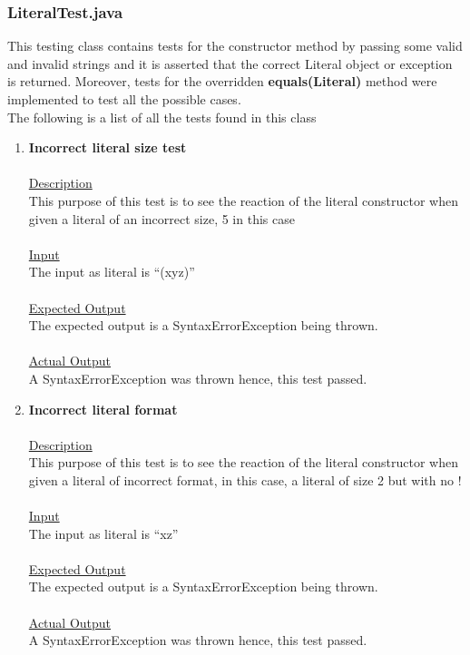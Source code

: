 \documentclass{article}
\newcommand{\quotes}[1]{``#1''}
\begin{document}
	\subsubsection{LiteralTest.java}
	
	This testing class contains tests for the constructor method by passing some valid and invalid strings and it is asserted that the correct Literal object or exception is returned. Moreover, tests for the overridden \textbf{equals(Literal)} method were implemented to test all the possible cases.\\
	The following is a list of all the tests found in this class
	

	\begin{enumerate}
		\item \textbf{Incorrect literal size test}\\\\
		\underline{Description}\\
		\indent This purpose of this test is to see the reaction of the literal constructor when given a literal of an incorrect size, 5 in this case\\\\
		\underline{Input}\\
		\indent The input as literal is \quotes{(xyz)}\\	\\
		\underline{Expected Output}\\
		\indent The expected output is a SyntaxErrorException being thrown.\\\\
		\underline{Actual Output}\\
		\indent A SyntaxErrorException was thrown hence, this test passed.\\
		
		\item \textbf{Incorrect literal format}\\\\
		\underline{Description}\\
		\indent This purpose of this test is to see the reaction of the literal constructor when given a literal of incorrect format, in this case, a literal of size 2 but with no !\\\\
		\underline{Input}\\
		\indent The input as literal is \quotes{xz}\\	\\
		\underline{Expected Output}\\
		\indent The expected output is a SyntaxErrorException being thrown.\\\\
		\underline{Actual Output}\\
		\indent A SyntaxErrorException was thrown hence, this test passed.\\
		

\end{enumerate}
\end{document}
